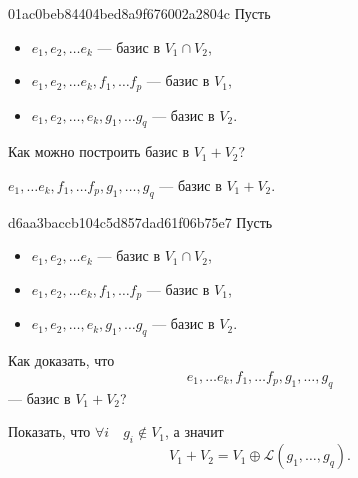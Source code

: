 \begin{note}{01ac0beb84404bed8a9f676002a2804c}
    Пусть
    \begin{itemize}
        \item \( e_1,e_2,\ldots e_k \) --- базис в \( V_1 \cap V_2 \),
        \item \( e_1,e_2,\ldots e_k, f_1,\ldots f_p \) --- базис в \( V_1 \),
        \item \( e_1,e_2,\ldots, e_k, g_1,\ldots g_q \) --- базис в \( V_2 \).
    \end{itemize}
    Как можно построить базис в \( V_1 + V_2 \)?

    \begin{cloze}{1}
        \( e_1,\ldots e_k, f_1,\ldots f_p, g_1,\ldots, g_q \) --- базис в \( V_1 + V_2 \).
    \end{cloze}
\end{note}

\begin{note}{d6aa3baccb104c5d857dad61f06b75e7}
    Пусть
    \begin{itemize}
        \item \( e_1,e_2,\ldots e_k \) --- базис в \( V_1 \cap V_2 \),
        \item \( e_1,e_2,\ldots e_k, f_1,\ldots f_p \) --- базис в \( V_1 \),
        \item \( e_1,e_2,\ldots, e_k, g_1,\ldots g_q \) --- базис в \( V_2 \).
    \end{itemize}
    Как доказать, что
    \[
        e_1,\ldots e_k, f_1,\ldots f_p, g_1,\ldots, g_q
    \]
    --- базис в \( V_1 + V_2 \)?

    \begin{cloze}{1}
        Показать, что \( \forall i \quad g_i \not\in V_1 \), а значит
        \[
            V_1 + V_2 = V_1 \oplus \mathscr L (g_1, \ldots, g_q).
        \]
    \end{cloze}
\end{note}

